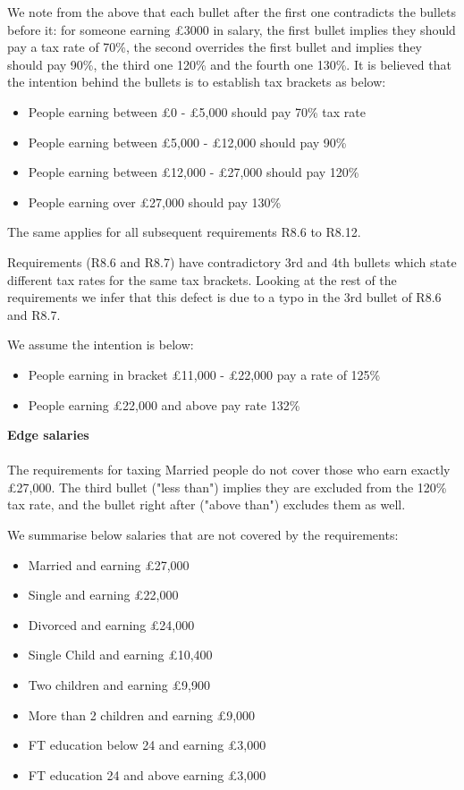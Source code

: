 We note from the above that each bullet after the first one contradicts the bullets before it: for someone earning £3000 in salary, the first bullet implies they should pay a tax rate of 70\%, the second overrides the first bullet and implies they should pay 90\%, the third one 120\% and the fourth one 130\%. It is believed that the intention behind the bullets is to establish tax brackets as below: 
\begin{itemize}[noitemsep]
	\item People earning between £0 - £5,000 should pay 70\% tax rate 
	\item People earning between £5,000 - £12,000 should pay 90\%
	\item People earning between £12,000 - £27,000 should pay 120\%
	\item People earning over £27,000 should pay 130\%
\end{itemize}
The same applies for all subsequent requirements R8.6 to R8.12. 

Requirements (R8.6 and R8.7) have contradictory 3rd and 4th bullets which state different tax rates for the same tax brackets. Looking at the rest of the requirements we infer that this defect is due to a typo in the 3rd bullet of R8.6 and R8.7. 

We assume the intention is below: 
\begin{itemize}[noitemsep]
	\item People earning in bracket £11,000 - £22,000 pay a rate of 125\%
	\item People earning £22,000 and above pay rate 132\%
\end{itemize}

\textbf{Edge salaries\\}
\\
The requirements for taxing Married people do not cover those who earn exactly £27,000. The third bullet ("less than") implies they are excluded from the 120\% tax rate, and the bullet right after ("above than") excludes them as well. 
\par
We summarise below salaries that are not covered by the requirements:  
\begin{itemize}[noitemsep]
	\item Married and earning £27,000
	\item Single and earning £22,000
	\item Divorced and earning £24,000
	\item Single Child and earning £10,400
	\item Two children and earning £9,900
	\item More than 2 children and earning £9,000
	\item FT education below 24 and earning £3,000
	\item FT education 24 and above earning £3,000
\end{itemize}

